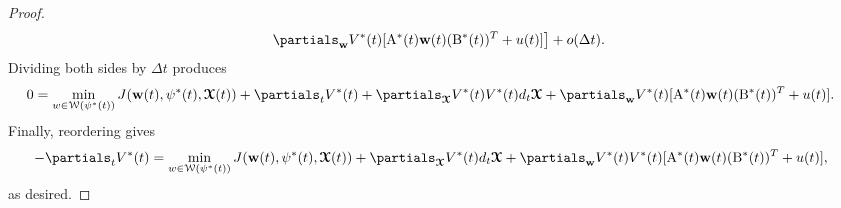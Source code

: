 \begin{proof}
\begin{align*}
        \left. \partials_{\weight}V^*(t) [\mathrm{A}^*(t)\weight(t)( \mathrm{B}^*(t))^T + u(t)]\right] + o(\Delta t).
    \end{align*}
    Dividing both sides by $\Delta t$ produces
    \begin{align*}
        0 & = \min_{w\in \mathcal{W}(\psi^*(t))} J(\weight(t),\psi^*(t),\tx(t)) +
        \partials_{t}V^*(t)  + \partials_{\tx}V^*(t) V^*(t) d_{t} \tx + \partials_{\weight}V^*(t) [\mathrm{A}^*(t)\weight(t)( \mathrm{B}^*(t))^T + u(t)].
    \end{align*}
    Finally, reordering gives
    \begin{align*}
        -\partials_{t} V^*(t) & = \min_{w\in \mathcal{W}(\psi^*(t))} J(\weight(t),\psi^*(t),\tx(t))+ \partials_{\tx}V^*(t) d_{t} \tx + \partials_{\weight}V^*(t) V^*(t) [\mathrm{A}^*(t)\weight(t)( \mathrm{B}^*(t))^T + u(t)],
    \end{align*}
    as desired.
\end{proof}

